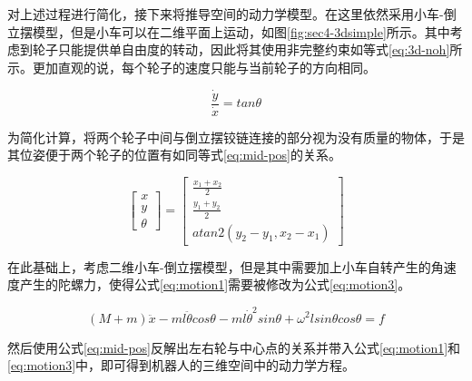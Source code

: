 对上述过程进行简化，接下来将推导空间的动力学模型。在这里依然采用小车-倒立摆模型，但是小车可以在二维平面上运动，如图\ref{fig:sec4-3dsimple}所示。其中考虑到轮子只能提供单自由度的转动，因此将其使用非完整约束如等式\ref{eq:3d-noh}所示。更加直观的说，每个轮子的速度只能与当前轮子的方向相同。

\begin{equation}
    \frac{\dot{y}}{\dot{x}} = tan \theta
    \label{eq:3d-noh}
\end{equation}

为简化计算，将两个轮子中间与倒立摆铰链连接的部分视为没有质量的物体，于是其位姿便于两个轮子的位置有如同等式\ref{eq:mid-pos}的关系。

\begin{equation}
    \begin{bmatrix}
        x \\
        y \\
        \theta 
    \end{bmatrix} = 
    \begin{bmatrix}
        \frac{x_1+x_2}{2} \\
        \frac{y_1+y_2}{2} \\
        atan2(y_2-y_1, x_2-x_1)
    \end{bmatrix}
    \label{eq:mid-pos}
\end{equation}

在此基础上，考虑二维小车-倒立摆模型，但是其中需要加上小车自转产生的角速度产生的陀螺力，使得公式\ref{eq:motion1}需要被修改为公式\ref{eq:motion3}。

\begin{equation}
    (M+m)\ddot{x} - ml\ddot{\theta}cos\theta - ml\dot{\theta}^2 sin\theta + \omega^2 lsin\theta cos\theta = f
    \label{eq:motion3}
\end{equation}

然后使用公式\ref{eq:mid-pos}反解出左右轮与中心点的关系并带入公式\ref{eq:motion1}和\ref{eq:motion3}中，即可得到机器人的三维空间中的动力学方程。

